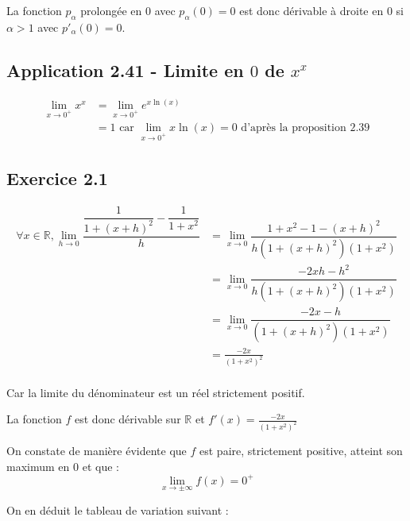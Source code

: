\documentclass{report}
\begin{document}
La fonction $p_{\alpha}$ prolongée en $0$ avec $p_{\alpha}(0)=0$ est donc dérivable à droite en $0$ si $\alpha>1$
avec $p'_{\alpha}(0)=0$.


\subsection*{Application 2.41 - Limite en $0$ de $x^x$}

\begin{equation*}
	\begin{split}
		\lim_{x\rightarrow 0^{+}} x^x
		&= \lim_{x\rightarrow 0^{+}} e^{x\ln(x)} \\
	    &= 1 \text{ car  $\lim_{x\rightarrow 0^{+}} x\ln(x) = 0$ d'après la proposition 2.39}
	\end{split}
\end{equation*}


\subsection*{Exercice 2.1}

\begin{equation*}
	\begin{split}
		\forall x \in \mathbb{R}, \lim_{h\rightarrow 0} \dfrac{\dfrac{1}{1+(x+h)^2}-\dfrac{1}{1+x^2}}{h}
		&= \lim_{x\rightarrow 0} \dfrac{1+x^2-1-(x+h)^2}{h(1+(x+h)^2)(1+x^2)} \\
		&= \lim_{x\rightarrow 0} \dfrac{-2xh-h^2}{h(1+(x+h)^2)(1+x^2)} \\
		&= \lim_{x\rightarrow 0} \dfrac{-2x-h}{(1+(x+h)^2)(1+x^2)} \\
		&= \frac{-2x}{(1+x^2)^2} \\
	\end{split}
\end{equation*}

Car la limite du dénominateur est un réel strictement positif.

La fonction $f$ est donc dérivable sur $\mathbb{R}$ et $f'(x) = \frac{-2x}{(1+x^2)^2}$

On constate de manière évidente que $f$ est paire, strictement positive, atteint son maximum en $0$ et que :
\begin{displaymath}
	\lim_{x \rightarrow \pm \infty} f(x) = 0^{+}
\end{displaymath}


On en déduit le tableau de variation suivant :

\end{document}
